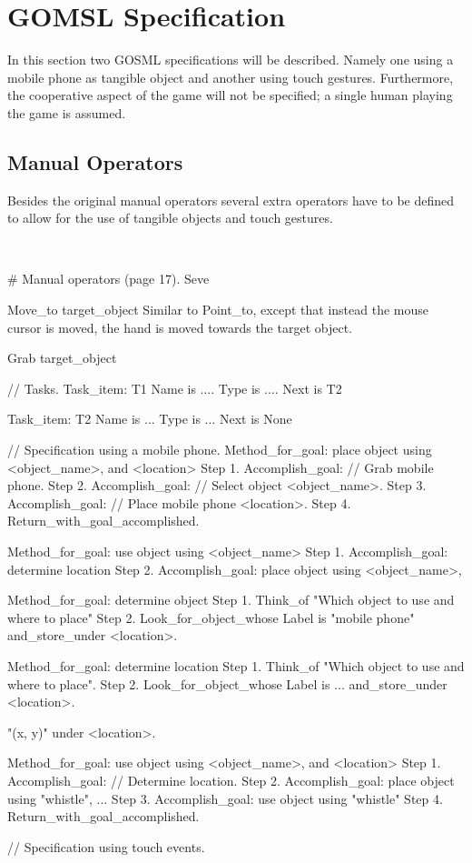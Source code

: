 \documentclass[a4paper,11pt]{report}
\begin{document}
	\section{GOMSL Specification}
	In this section two GOSML specifications will be described. Namely one using a mobile phone as tangible object and another using touch gestures. Furthermore, the cooperative aspect of the game will not be specified; a single human playing the game is assumed.
	
		\subsection{Manual Operators}
		Besides the original manual operators several extra operators have to be defined to allow for the use of tangible objects and touch gestures.
		
		\

# Manual operators (page 17).
Seve

Move_to target_object
Similar to Point_to, except that instead the mouse cursor is moved, the hand is moved towards the target object.

Grab target_object


// Tasks.
Task_item: T1
	Name is ....
	Type is ....
	Next is T2
	
Task_item: T2
	Name is ...
	Type is ...
	Next is None

// Specification using a mobile phone.
Method_for_goal: place object using <object_name>, and <location>
	Step 1. Accomplish_goal: // Grab mobile phone.
	Step 2. Accomplish_goal: // Select object <object_name>.
	Step 3. Accomplish_goal: // Place mobile phone <location>.
	Step 4. Return_with_goal_accomplished.
	
Method_for_goal: use object using <object_name>
	Step 1. Accomplish_goal: determine location
	Step 2. Accomplish_goal: place object using <object_name>, 


Method_for_goal: determine object
	Step 1. Think_of "Which object to use and where to place"
	Step 2. Look_for_object_whose Label is "mobile phone"
			and_store_under <location>.


Method_for_goal: determine location
	Step 1. Think_of "Which object to use and where to place".
	Step 2. Look_for_object_whose Label is ...
	 		and_store_under <location>.
	
	"(x, y)" under <location>.
	


Method_for_goal: use object using <object_name>, and <location>
	Step 1. Accomplish_goal: // Determine location.
	Step 2. Accomplish_goal: place object using "whistle", ...
	Step 3. Accomplish_goal: use object using "whistle"
	Step 4. Return_with_goal_accomplished.

// Specification using touch events.
\end{document}
